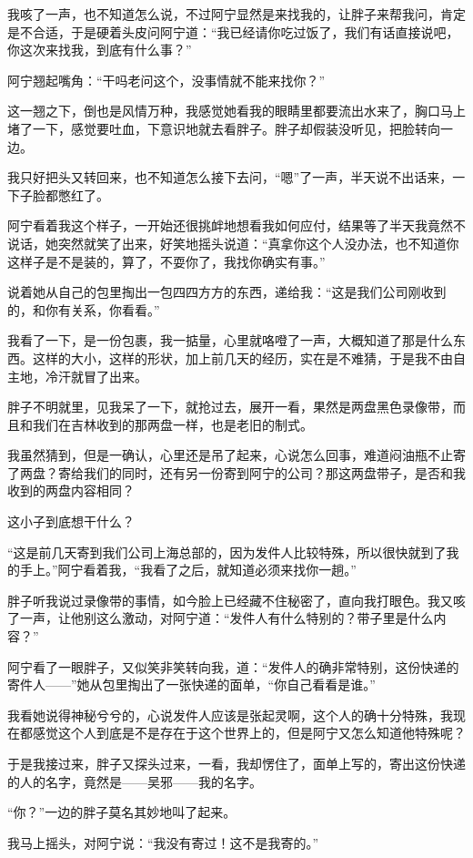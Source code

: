 我咳了一声，也不知道怎么说，不过阿宁显然是来找我的，让胖子来帮我问，肯定是不合适，于是硬着头皮问阿宁道：“我已经请你吃过饭了，我们有话直接说吧，你这次来找我，到底有什么事？”

阿宁翘起嘴角：“干吗老问这个，没事情就不能来找你？”

这一翘之下，倒也是风情万种，我感觉她看我的眼睛里都要流出水来了，胸口马上堵了一下，感觉要吐血，下意识地就去看胖子。胖子却假装没听见，把脸转向一边。

我只好把头又转回来，也不知道怎么接下去问，“嗯”了一声，半天说不出话来，一下子脸都憋红了。

阿宁看着我这个样子，一开始还很挑衅地想看我如何应付，结果等了半天我竟然不说话，她突然就笑了出来，好笑地摇头说道：“真拿你这个人没办法，也不知道你这样子是不是装的，算了，不耍你了，我找你确实有事。”

说着她从自己的包里掏出一包四四方方的东西，递给我：“这是我们公司刚收到的，和你有关系，你看看。”

我看了一下，是一份包裹，我一掂量，心里就咯噔了一声，大概知道了那是什么东西。这样的大小，这样的形状，加上前几天的经历，实在是不难猜，于是我不由自主地，冷汗就冒了出来。

胖子不明就里，见我呆了一下，就抢过去，展开一看，果然是两盘黑色录像带，而且和我们在吉林收到的那两盘一样，也是老旧的制式。

我虽然猜到，但是一确认，心里还是吊了起来，心说怎么回事，难道闷油瓶不止寄了两盘？寄给我们的同时，还有另一份寄到阿宁的公司？那这两盘带子，是否和我收到的两盘内容相同？

这小子到底想干什么？

“这是前几天寄到我们公司上海总部的，因为发件人比较特殊，所以很快就到了我的手上。”阿宁看着我，“我看了之后，就知道必须来找你一趟。”

胖子听我说过录像带的事情，如今脸上已经藏不住秘密了，直向我打眼色。我又咳了一声，让他别这么激动，对阿宁道：“发件人有什么特别的？带子里是什么内容？”

阿宁看了一眼胖子，又似笑非笑转向我，道：“发件人的确非常特别，这份快递的寄件人——”她从包里掏出了一张快递的面单，“你自己看看是谁。”

我看她说得神秘兮兮的，心说发件人应该是张起灵啊，这个人的确十分特殊，我现在都感觉这个人到底是不是存在于这个世界上的，但是阿宁又怎么知道他特殊呢？

于是我接过来，胖子又探头过来，一看，我却愣住了，面单上写的，寄出这份快递的人的名字，竟然是——吴邪——我的名字。

“你？”一边的胖子莫名其妙地叫了起来。

我马上摇头，对阿宁说：“我没有寄过！这不是我寄的。”

